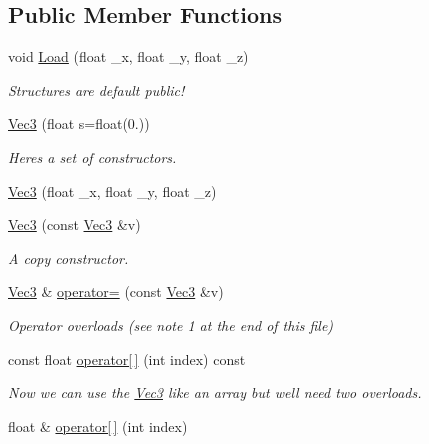 \subsection*{Public Member Functions}
\begin{DoxyCompactItemize}
\item 
void \hyperlink{struct_ori_engine_1_1_vec3_a5b144d090843acf90840393a1099a228}{Load} (float \+\_\+x, float \+\_\+y, float \+\_\+z)
\begin{DoxyCompactList}\small\item\em Structures are default public! \end{DoxyCompactList}\item 
\hyperlink{struct_ori_engine_1_1_vec3_a36bb2140a6a15310e08b4daaaf9a3909}{Vec3} (float s=float(0.))
\begin{DoxyCompactList}\small\item\em Here\textquotesingle{}s a set of constructors. \end{DoxyCompactList}\item 
\hyperlink{struct_ori_engine_1_1_vec3_af2c77725c493c84a934fb358b311d87e}{Vec3} (float \+\_\+x, float \+\_\+y, float \+\_\+z)
\item 
\hyperlink{struct_ori_engine_1_1_vec3_adb231ac012b0ca1101b7e340bf2a72b0}{Vec3} (const \hyperlink{struct_ori_engine_1_1_vec3}{Vec3} \&v)
\begin{DoxyCompactList}\small\item\em A copy constructor. \end{DoxyCompactList}\item 
\hyperlink{struct_ori_engine_1_1_vec3}{Vec3} \& \hyperlink{struct_ori_engine_1_1_vec3_ab162ac7e06cb783bccc3375f9c75308a}{operator=} (const \hyperlink{struct_ori_engine_1_1_vec3}{Vec3} \&v)
\begin{DoxyCompactList}\small\item\em Operator overloads (see note 1 at the end of this file) \end{DoxyCompactList}\item 
const float \hyperlink{struct_ori_engine_1_1_vec3_a536dde0bfab3d42f2bae717b3b58df62}{operator\mbox{[}$\,$\mbox{]}} (int index) const
\begin{DoxyCompactList}\small\item\em Now we can use the \hyperlink{struct_ori_engine_1_1_vec3}{Vec3} like an array but we\textquotesingle{}ll need two overloads. \end{DoxyCompactList}\item 
float \& \hyperlink{struct_ori_engine_1_1_vec3_a71c0ae39cb5f864517078494ea528970}{operator\mbox{[}$\,$\mbox{]}} (int index)

\end{DoxyCompactItemize}
